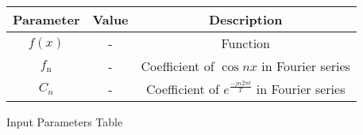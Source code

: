 \centering
\begin{tabular}{|c|c|c|}
	\hline
	\textbf{Parameter} & \textbf{Value} & \textbf{Description} \\
	\hline
	$f(x)$ & - & Function \\
	\hline
	$f_{\text{n}}$ & - & Coefficient of $\cos{nx}$ in Fourier series\\
	\hline 
	$C_n$ & - & Coefficient of $e^{\frac{-jn2\pi t}{T}}$ in Fourier series \\
	\hline
\end{tabular}
\caption{Input Parameters Table}
\label{tab:gateCE22.30.1}
